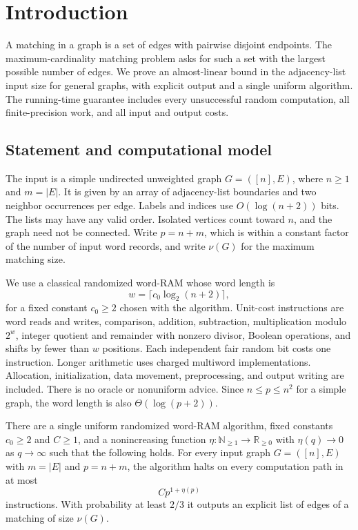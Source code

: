\section{Introduction}\label{sec:introduction}

A matching in a graph is a set of edges with pairwise disjoint endpoints.
The maximum-cardinality matching problem asks for such a set with the largest
possible number of edges. We prove an almost-linear bound in the adjacency-list
input size for general graphs, with explicit output and a single uniform algorithm.
The running-time guarantee includes every unsuccessful random computation,
all finite-precision work, and all input and output costs.

\subsection{Statement and computational model}

The input is a simple undirected unweighted graph $G=([n],E)$, where $n\ge1$
and $m=|E|$. It is given by an array of adjacency-list boundaries and two
neighbor occurrences per edge. Labels and indices use $O(\log(n+2))$ bits.
The lists may have any valid order. Isolated vertices count toward $n$, and
the graph need not be connected. Write $p=n+m$, which is within a constant
factor of the number of input word records, and write $\nu(G)$ for the maximum
matching size.

We use a classical randomized word-RAM whose word length is
\[
                     w=\lceil c_0\log_2(n+2)\rceil,
\]
for a fixed constant $c_0\ge2$ chosen with the algorithm. Unit-cost instructions
are word reads and writes, comparison, addition, subtraction, multiplication
modulo $2^w$, integer quotient and remainder with nonzero divisor, Boolean
operations, and shifts by fewer than $w$ positions. Each independent fair
random bit costs one instruction. Longer arithmetic uses charged multiword
implementations. Allocation, initialization, data movement, preprocessing,
and output writing are included. There is no oracle or nonuniform advice.
Since $n\le p\le n^2$ for a simple graph, the word length is also
$\Theta(\log(p+2))$.

\begin{theorem}\label{thm:main}
There are a single uniform randomized word-RAM algorithm, fixed constants
$c_0\ge2$ and $C\ge1$, and a nonincreasing function
$\eta:\mathbb N_{\ge1}\to\mathbb R_{\ge0}$ with $\eta(q)\to0$ as
$q\to\infty$ such that the following holds.
For every input graph $G=([n],E)$ with $m=|E|$ and $p=n+m$, the algorithm
halts on every computation path in at most
\[
                          C p^{1+\eta(p)}
\]
instructions. With probability at least $2/3$ it outputs an explicit list of
edges of a matching of size $\nu(G)$.
\end{theorem}

